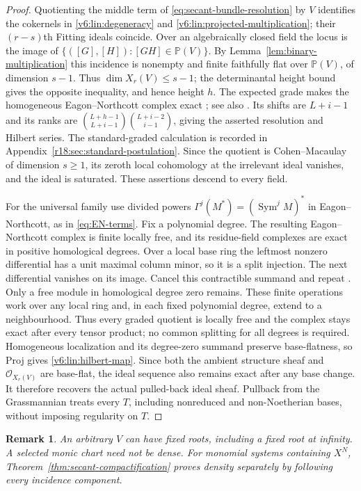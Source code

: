 \documentclass[10pt,fleqn]{article}
\numberwithin{equation}{section}
\newtheorem{remark}[theorem]{Remark}
\newcommand{\PP}{\mathbb P}
\begin{document}
\begin{proof}
Quotienting the middle term of \eqref{eq:secant-bundle-resolution} by
$V$ identifies the cokernels in \eqref{v6:lin:degeneracy} and
\eqref{v6:lin:projected-multiplication}; their $(r-s)$th Fitting ideals coincide.
Over an algebraically closed field the locus is the image of
$\{([G],[H]):[GH]\in\PP(V)\}$.
By Lemma~\ref{lem:binary-multiplication} this incidence is nonempty
and finite faithfully flat over $\PP(V)$, of dimension $s-1$.
Thus $\dim X_r(V)\le s-1$; the determinantal height bound gives the
opposite inequality, and hence height $h$.
The expected grade makes the homogeneous Eagon--Northcott complex
exact \cite[Chapter~2]{BrunsVetter}; see also \cite{EagonNorthcott}.
Its shifts are $L+i-1$ and its ranks are
$\binom{L+h-1}{L+i-1}\binom{L+i-2}{i-1}$, giving the asserted
resolution and Hilbert series.  The standard-graded calculation is
recorded in Appendix~\ref{r18:sec:standard-postulation}.
Since the quotient is Cohen--Macaulay of dimension $s\ge1$,
its zeroth local cohomology at the irrelevant ideal vanishes,
and the ideal is saturated.  These assertions
descend to every field.

For the universal family use divided powers
$\Gamma^j(M^*)=(\operatorname{Sym}^j M)^*$ in Eagon--Northcott,
as in \eqref{eq:EN-terms}.  Fix a polynomial degree.  The resulting
Eagon--Northcott complex is finite locally free, and its residue-field
complexes are exact in positive homological degrees.  Over a local
base ring the leftmost nonzero differential has a unit maximal column
minor, so it is a split injection.  The next differential vanishes on
its image.  Cancel this contractible summand and repeat
\cite[Tag~00MT]{Stacks}.  Only a free module in homological degree zero
remains.  These finite operations work over any local ring and, in
each fixed polynomial degree, extend to a neighbourhood.  Thus every
graded quotient is locally free and the complex stays exact after
every tensor product; no common splitting for all degrees is required.
Homogeneous localization and its degree-zero summand preserve
base-flatness, so Proj gives \eqref{v6:lin:hilbert-map}.
Since both the ambient structure sheaf and $\mathcal O_{X_r(V)}$ are
base-flat, the ideal sequence also remains exact after any base change.
It therefore recovers the actual pulled-back ideal sheaf.  Pullback
from the Grassmannian treats every $T$, including nonreduced and
non-Noetherian bases, without imposing regularity on $T$.
\end{proof}

\begin{remark}\label{v6:lin:chart-scope}
An arbitrary $V$ can have fixed roots, including a fixed root at
infinity.  A selected monic chart need not be dense.  For monomial systems
containing $X^N$, Theorem~\ref{thm:secant-compactification} proves
density separately by following every incidence component.
\end{remark}
\end{document}
